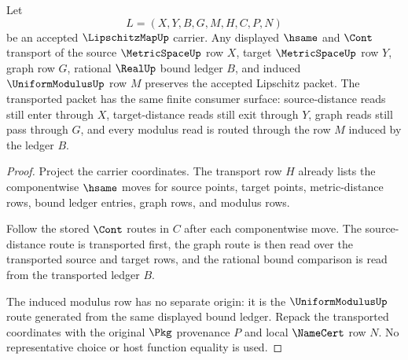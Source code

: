 \begin{theorem}
\label{thm:lipschitz-map-bound-transport}
Let
$$
L=(X,Y,B,G,M,H,C,P,N)
$$
be an accepted $\LipschitzMapUp$ carrier. Any displayed $\hsame$ and $\Cont$
transport of the source $\MetricSpaceUp$ row $X$, target $\MetricSpaceUp$ row
$Y$, graph row $G$, rational $\RealUp$ bound ledger $B$, and induced
$\UniformModulusUp$ row $M$ preserves the accepted Lipschitz packet. The
transported packet has the same finite consumer surface: source-distance reads
still enter through $X$, target-distance reads still exit through $Y$, graph
reads still pass through $G$, and every modulus read is routed through the row
$M$ induced by the ledger $B$.
\end{theorem}
\begin{proof}
Project the carrier coordinates. The transport row $H$ already lists the
componentwise $\hsame$ moves for source points, target points, metric-distance
rows, bound ledger entries, graph rows, and modulus rows.

Follow the stored $\Cont$ routes in $C$ after each componentwise move. The
source-distance route is transported first, the graph route is then read over
the transported source and target rows, and the rational bound comparison is
read from the transported ledger $B$.

The induced modulus row has no separate origin: it is the $\UniformModulusUp$
route generated from the same displayed bound ledger. Repack the transported
coordinates with the original $\Pkg$ provenance $P$ and local $\NameCert$ row
$N$. No representative choice or host function equality is used.
\end{proof}


